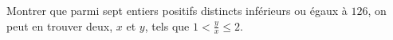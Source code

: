Montrer que parmi sept entiers positifs distincts inférieurs ou égaux à $126$, on peut en trouver deux, $x$ et $y$, tels que $1 < \frac{y}{x} \leq 2$.
